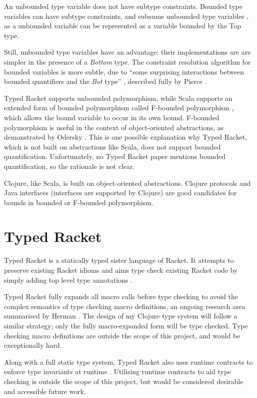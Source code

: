 An unbounded type variable does not have subtype constraints.
Bounded type variables can have subtype constraints, and 
subsume unbounded type variables \cite{PT00}, 
as a unbounded variable can be represented as a variable bounded
by the Top type.

Still, unbounded type variables have an advantage: their implementations are
are simpler in the presence of a \emph{Bottom} type. 
The constraint resolution algorithm for bounded variables
is more subtle, due to ``some surprising interactions between bounded quantifiers
and the \emph{Bot} type'' \cite{PT00}, described fully
by Pierce \cite{Pie97}.

Typed Racket \cite{TF08}
supports unbounded polymorphism, while Scala \cite{OCD+}
supports an extended form of bounded polymorphism called
F-bounded polymorphism \cite{CCHOM89}, which allows the
bound variable to occur in its own bound.
F-bounded polymorphism is useful in the context of object-oriented abstractions,
as demonstrated by Odersky \cite{OCD+}.
This is one possible explanation why Typed Racket, which is not built on abstractions like Scala,
does not support bounded quantification. Unfortunately, no Typed Racket paper mentions 
bounded quantification, so the rationale is not clear.

Clojure, like Scala, is built on object-oriented abstractions. Clojure protocols
and Java interfaces (interfaces are supported by Clojure) are good candidates
for bounds in bounded or F-bounded polymorphism.

\section{Typed Racket}

Typed Racket is a statically typed sister language of Racket. It
attempts to preserve existing Racket idioms and aims type check
existing Racket code by simply adding top level type annotations \cite{Tob10}.

Typed Racket fully expands all macro calls before type checking \cite{Tob10} to
avoid the complex semantics of type checking macro definitions, an ongoing research area summarised
 by Herman \cite{Her10}.
The design of my Clojure type system will follow a similar strategy; only the fully macro-expanded form
will be type checked. Type checking macro definitions are outside the scope of this project, and would
be exceptionally hard.

Along with a full static type system, Typed Racket 
also uses runtime contracts to enforce type invariants at runtime \cite{TF08}.
Utilising runtime contracts to aid type checking is outside the scope of this project, but would be 
considered desirable and accessible future work.

